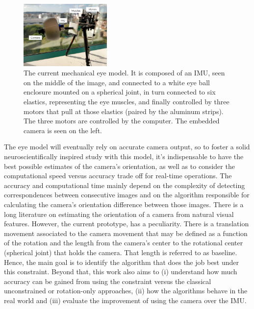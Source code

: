 \begin{figure}[ht]
	\centering
	\includegraphics[width=0.4\textwidth]{images/prototypenew.png}
	\caption{The current mechanical eye model. It is composed of an IMU, seen on the middle of the image, and connected to a white eye ball enclosure mounted on a spherical joint, in turn connected to six elastics, representing the eye muscles, and finally controlled by three motors that pull at those elastics (paired by the aluminum strips). The three motors are controlled by the computer. The embedded camera is seen on the left.}
	\label{cha1:sec1:fig:curr_eye_model}
\end{figure}

The eye model will eventually rely on accurate camera output, so to foster a solid neuroscientifically inspired study with this model, it's indispensable to have the best possible estimates of the camera's orientation, as well as to consider the computational speed versus accuracy trade off for real-time operations. The accuracy and computational time mainly depend on the complexity of detecting correspondences between consecutive images and on the algorithm responsible for calculating the camera's orientation difference between those images. 
There is a long literature on estimating the orientation of a camera from natural visual features. However, the current prototype, has a peculiarity. There is a translation movement associated to the camera movement that may be defined as a function of the rotation and the length from the camera's center to the rotational center (spherical joint) that holds the camera. That length is referred to as baseline. Hence, the main goal  is to identify the algorithm that does the job best under this constraint. Beyond that, this work also aims to (i) understand how much  accuracy can be gained from using the constraint versus the classical unconstrained or rotation-only approaches, (ii) how the algorithms behave in the real world and (iii) evaluate the improvement of using the camera over the IMU.



